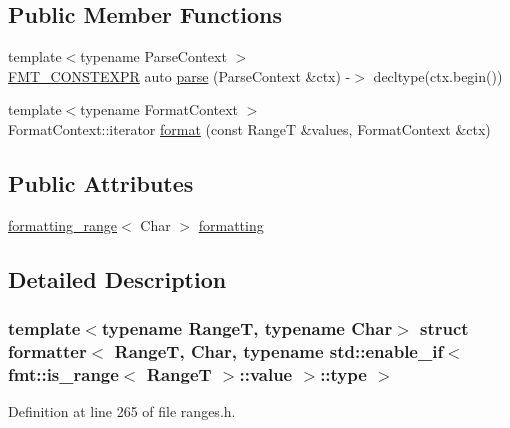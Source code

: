 \subsection*{Public Member Functions}
\begin{DoxyCompactItemize}
\item 
{\footnotesize template$<$typename Parse\+Context $>$ }\\\hyperlink{core_8h_a69201cb276383873487bf68b4ef8b4cd}{F\+M\+T\+\_\+\+C\+O\+N\+S\+T\+E\+X\+PR} auto \hyperlink{structformatter_3_01_range_t_00_01_char_00_01typename_01std_1_1enable__if_3_01fmt_1_1is__range_338ef07b6d6c7537efaa2c888f2ea4c8d_a44de9d8176748d483fc5471afe644b73}{parse} (Parse\+Context \&ctx) -\/$>$ decltype(ctx.\+begin())
\item 
{\footnotesize template$<$typename Format\+Context $>$ }\\Format\+Context\+::iterator \hyperlink{structformatter_3_01_range_t_00_01_char_00_01typename_01std_1_1enable__if_3_01fmt_1_1is__range_338ef07b6d6c7537efaa2c888f2ea4c8d_a3fa03f9297c176ec30214531355f9ff3}{format} (const RangeT \&values, Format\+Context \&ctx)
\end{DoxyCompactItemize}
\subsection*{Public Attributes}
\begin{DoxyCompactItemize}
\item 
\hyperlink{structformatting__range}{formatting\+\_\+range}$<$ Char $>$ \hyperlink{structformatter_3_01_range_t_00_01_char_00_01typename_01std_1_1enable__if_3_01fmt_1_1is__range_338ef07b6d6c7537efaa2c888f2ea4c8d_aa3df697d3373d6ad318447f6b31a3daf}{formatting}
\end{DoxyCompactItemize}


\subsection{Detailed Description}
\subsubsection*{template$<$typename RangeT, typename Char$>$\newline
struct formatter$<$ Range\+T, Char, typename std\+::enable\+\_\+if$<$ fmt\+::is\+\_\+range$<$ Range\+T $>$\+::value $>$\+::type $>$}



Definition at line 265 of file ranges.\+h.



